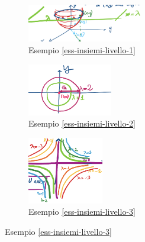 \begin{figure}[h!]
\centering
\begin{subfigure}{.3\textwidth}
    \centering
    \includegraphics[width=5cm]{images/ess-insiemi-livello-1.png}
    \caption{Esempio \ref{ess-insiemi-livello-1}}
\end{subfigure}
\begin{subfigure}{.3\textwidth}
    \centering
    \includegraphics[width=3.7cm]{images/ess-insiemi-livello-2.png}
    \caption{Esempio \ref{ess-insiemi-livello-2}}
\end{subfigure}
\begin{subfigure}{.3\textwidth}
    \centering
    \includegraphics[width=3.3cm]{images/ess-insiemi-livello-3.png}
    \caption{Esempio \ref{ess-insiemi-livello-3}}
\end{subfigure}
\end{figure}